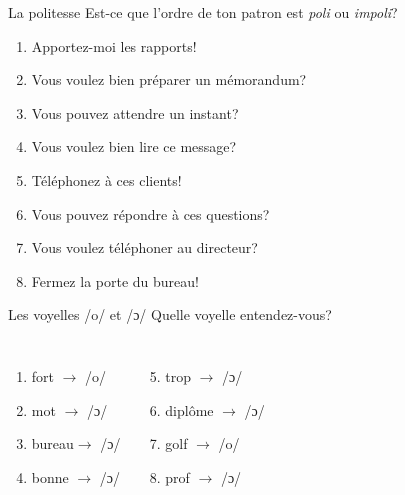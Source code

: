\documentclass{beamer}
\begin{document}
  \begin{frame}{La politesse}
    Est-ce que l'ordre de ton patron  est \emph{poli} ou \emph{impoli}? \\
    \begin{center}
      \begin{enumerate}
        \item Apportez-moi les rapports! \underline{}
        \item Vous voulez bien préparer un mémorandum? \underline{}
        \item Vous pouvez attendre un instant? \underline{}
        \item Vous voulez bien lire ce message? \underline{}
        \item Téléphonez à ces clients! \underline{}
        \item Vous pouvez répondre à ces questions? \underline{}
        \item Vous voulez téléphoner au directeur? \underline{}
        \item Fermez la porte du bureau! \underline{}
      \end{enumerate}
    \end{center}
  \end{frame}

  \begin{frame}{Les voyelles /o/ et /ɔ/}
    Quelle voyelle entendez-vous? \\
    \begin{columns}
        \begin{enumerate}
          \item fort $\to$ /o/ 
          \item mot $\to$  /ɔ/
          \item bureau$\to$  /ɔ/
          \item bonne $\to$  /ɔ/
        \end{enumerate}
        \begin{enumerate}
          \setcounter{enumi}{4}
          \item trop $\to$  /ɔ/
          \item diplôme $\to$  /ɔ/
          \item golf $\to$ /o/ 
          \item prof $\to$  /ɔ/
        \end{enumerate}
    \end{columns}
  \end{frame}
\end{document}
